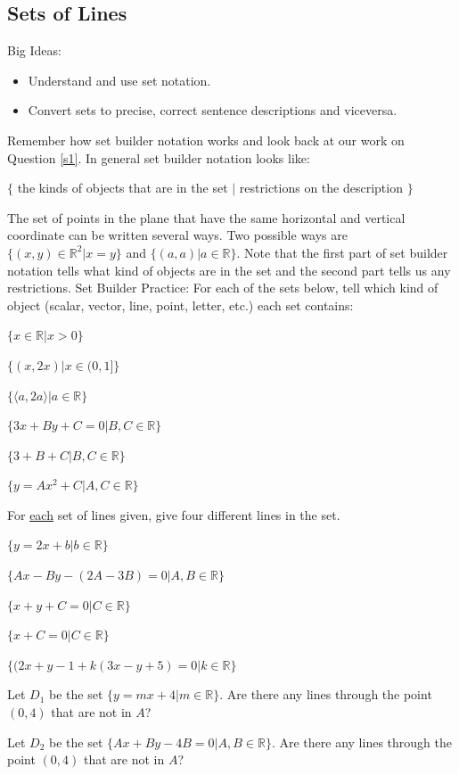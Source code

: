 \subsection{Sets of Lines}
Big Ideas:
\begin{itemize}
\item Understand and use set notation.
\item Convert sets to precise, correct sentence descriptions and viceversa.
\end{itemize}

Remember how set builder notation works and look back at our work on Question \ref{s1}. In general set builder notation looks like:

$\{ $ the kinds of objects that are in the set $|$ restrictions on the description $\}$

The set of points in the plane that have the same horizontal and vertical coordinate can be written several ways. Two possible ways are $\{ (x,y) \in \mathbb{R}^2 | x=y\}$ and $\{(a,a)|a \in \mathbb{R} \}$. Note that the first part of set builder notation tells what kind of objects are in the set and the second part tells us any restrictions.
\bq
Set Builder Practice: For each of the sets below, tell which kind of object (scalar, vector, line, point, letter, etc.) each set contains:
\be
\item $\{ x \in \mathbb{R} | x >0 \}$
\item $\{ (x,2x) | x \in (0,1] \}$
\item $\{ \langle a,2a \rangle | a \in \mathbb{R} \}$
\item $\{ 3x+By+C=0 | B,C \in \mathbb{R} \}$
\item $\{ 3+B+C | B,C \in \mathbb{R} \}$
\item $\{ y=A x^2 +C | A,C \in \mathbb{R} \}$
\ee
\eq

\bq For \underline{each} set of lines given, give four different lines in the set.
\be
\item $\{ y=2x+b| b \in \mathbb{R}\}$
\item $\{ Ax-By-(2A-3B)=0| A,B \in \mathbb{R} \}$
\item $\{ x+y+C=0| C \in \mathbb{R} \}$
\item $\{ x+C=0| C \in \mathbb{R}\}$
\item $\{ (2x+y-1+k(3x-y+5)=0| k \in \mathbb{R}\}$
\ee
\eq

\bq
\be
\item Let $D_1$ be the set $\{ y=mx+4| m \in \mathbb{R}\}$. Are there any lines through the point $(0,4)$ that are not in $A$?
\item Let $D_2$ be the set $\{ Ax+By-4B=0 | A,B \in \mathbb{R}\}$. Are there any lines through the point $(0,4)$ that are not in $A$?
\ee
\eq

